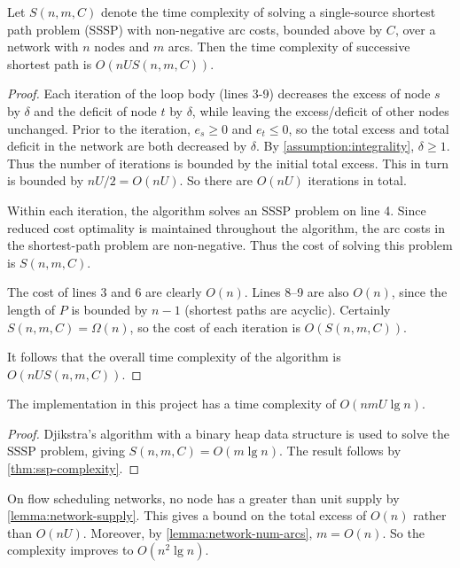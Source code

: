 \begin{thm} \label{thm:ssp-complexity}
Let $S(n,m,C)$ denote the time complexity of solving a single-source shortest path problem (SSSP) with non-negative arc costs, bounded above by $C$, over a network with $n$ nodes and $m$ arcs. Then the time complexity of successive shortest path is $O(nUS(n,m,C))$.
\end{thm}
\begin{proof}
Each iteration of the loop body (lines 3-9) decreases the excess of node $s$ by $\delta$ and the deficit of node $t$ by $\delta$, while leaving the excess/deficit of other nodes unchanged. Prior to the iteration, $e_s \geq 0$ and $e_t \leq 0$, so the total excess and total deficit in the network are both decreased by $\delta$. By \cref{assumption:integrality}, $\delta \geq 1$. Thus the number of iterations is bounded by the initial total excess. This in turn is bounded by $nU/2 = O(nU)$. So there are $O(nU)$ iterations in total.

Within each iteration, the algorithm solves an SSSP problem on line 4. Since reduced cost optimality is maintained throughout the algorithm, the arc costs in the shortest-path problem are non-negative\footnotemark. Thus the cost of solving this problem is $S(n,m,C)$.

The cost of lines 3 and 6 are clearly $O(n)$. Lines 8--9 are also $O(n)$, since the length of $P$ is bounded by $n-1$ (shortest paths are acyclic). Certainly $S(n,m,C) = \Omega(n)$, so the cost of each iteration is $O(S(n,m,C))$.

It follows that the overall time complexity of the algorithm is $O(nUS(n,m,C))$.
\end{proof}

\begin{cor}
The implementation in this project has a time complexity of $O(nmU \lg n)$.
\end{cor}
\begin{proof}
Djikstra's algorithm with a binary heap data structure is used to solve the SSSP problem, giving $S(n,m,C) = O(m \lg n)$. The result follows by \cref{thm:ssp-complexity}.
\end{proof}

\begin{remark}
On flow scheduling networks, no node has a greater than unit supply by \cref{lemma:network-supply}. This gives a bound on the total excess of $O(n)$ rather than $O(nU)$. Moreover, by \cref{lemma:network-num-arcs}, $m = O(n)$. So the complexity improves to $O(n^2 \lg n)$\footnotemark.
\end{remark}

